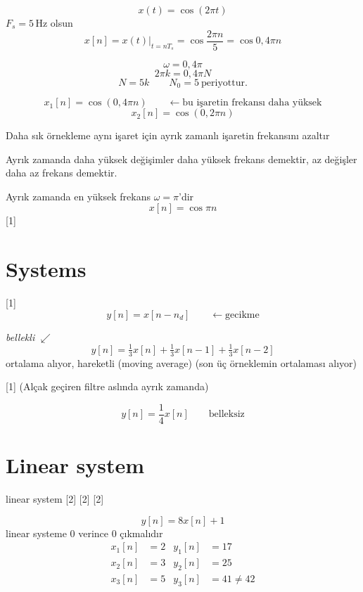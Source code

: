 \documentclass[11pt,a4paper]{article}
\begin{document}

\[ x(t)=\cos(2\pi t) \]
$F_s = 5\,\mathrm{Hz}$ olsun
\[ x[n] = x(t)\Big|_{t=nT_s} = \cos\frac{2\pi n}{5} = \cos 0{,}4\pi n \]

\[ \omega = 0{,}4\pi \]
\[ 2\pi k = 0{,}4\pi N \]
\[ N = 5k \qquad N_0 = 5 \ \text{periyottur.} \]

\[ x_1[n] = \cos(0{,}4\pi n) \qquad \leftarrow \text{bu işaretin frekansı daha yüksek} \]
\[ x_2[n] = \cos(0{,}2\pi n) \]

\begin{dikkat}
Daha sık örnekleme aynı işaret için ayrık zamanlı işaretin frekansını azaltır
\end{dikkat}

Ayrık zamanda daha yüksek değişimler daha yüksek frekans demektir, az değişler daha az frekans demektir.

Ayrık zamanda en yüksek frekans $\omega=\pi$'dir
\[ x[n]=\cos\pi n \]
[1]

\section{Systems}
[1]
\[ y[n] = x[n-n_d] \qquad \leftarrow \text{gecikme} \]

\textit{bellekli} $\swarrow$
\[ y[n] = \tfrac{1}{3}x[n] + \tfrac{1}{3}x[n-1] + \tfrac{1}{3}x[n-2] \]
ortalama alıyor, hareketli (moving average) (son üç örneklemin ortalaması alıyor)

[1]
(Alçak geçiren filtre aslında ayrık zamanda)

\[ y[n]=\frac{1}{4}x[n] \qquad \text{belleksiz} \]

\section{Linear system}
linear system
[2]
[2]
[2]

\[ y[n]=8x[n]+1 \]
linear systeme 0 verince 0 çıkmalıdır
\begin{align*}
x_1[n]&=2 & y_1[n]&=17\\
x_2[n]&=3 & y_2[n]&=25\\
x_3[n]&=5 & y_3[n]&=41\neq 42
\end{align*}
\end{document}
